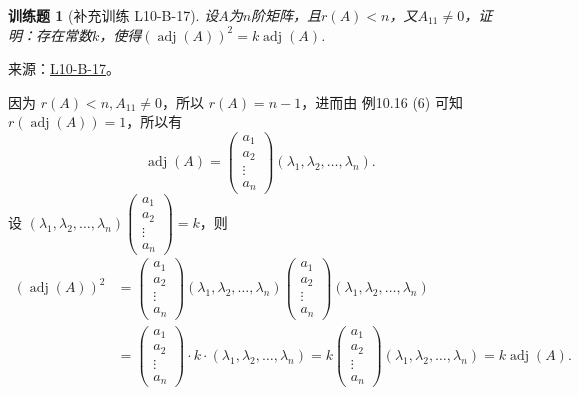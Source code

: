 \documentclass[12pt,fontset=fandol]{ctexart}
\newtheorem{exercise}{训练题}[section]
\begin{document}
\begin{exercise}[补充训练 L10-B-17]\label{prob:L10-B-17}
设$A$为$n$阶矩阵，且$r(A) < n$，又$A_{11} \neq 0$，证明：存在常数$k$，使得$(\operatorname{adj}(A))^2=k\operatorname{adj}(A)$.
\end{exercise}
\noindent 来源：\href{https://github.com/yhwu-is/Linear-Algebra-Left-Undone/blob/new/%E8%AE%B2%E4%B9%89/%E4%B8%93%E9%A2%98/10%20%E8%A1%8C%E5%88%97%E5%BC%8F.tex}{L10-B-17}。
\begin{solve}
因为 $r(A) < n, A_{11} \neq 0$，所以 $r(A) = n-1$，进而由 {例10.16 (6)} 可知 $r(\operatorname{adj}(A)) = 1$，所以有 
            \[\operatorname{adj}(A) = \begin{pmatrix} a_1 \\ a_2 \\ \vdots \\ a_n \end{pmatrix} (\lambda_1, \lambda_2, \ldots, \lambda_n).\]
            设 $(\lambda_1, \lambda_2, \ldots, \lambda_n) \begin{pmatrix} a_1 \\ a_2 \\ \vdots \\ a_n \end{pmatrix} = k$，则
            \begin{align*}
                (\operatorname{adj}(A))^2 & = \begin{pmatrix}a_1 \\ a_2 \\ \vdots \\ a_n \end{pmatrix}
                (\lambda_1, \lambda_2, \ldots, \lambda_n)
                \begin{pmatrix} a_1 \\ a_2 \\ \vdots \\ a_n \end{pmatrix}
                (\lambda_1, \lambda_2, \ldots, \lambda_n)                                     \\
                        & = \begin{pmatrix} a_1 \\ a_2 \\ \vdots \\ a_n \end{pmatrix} \cdot k
                \cdot (\lambda_1, \lambda_2, \ldots, \lambda_n) = k
                \begin{pmatrix} a_1 \\ a_2 \\ \vdots \\ a_n \end{pmatrix}
                (\lambda_1, \lambda_2, \ldots, \lambda_n) = k\operatorname{adj}(A).
            \end{align*}
\end{solve}
\end{document}
